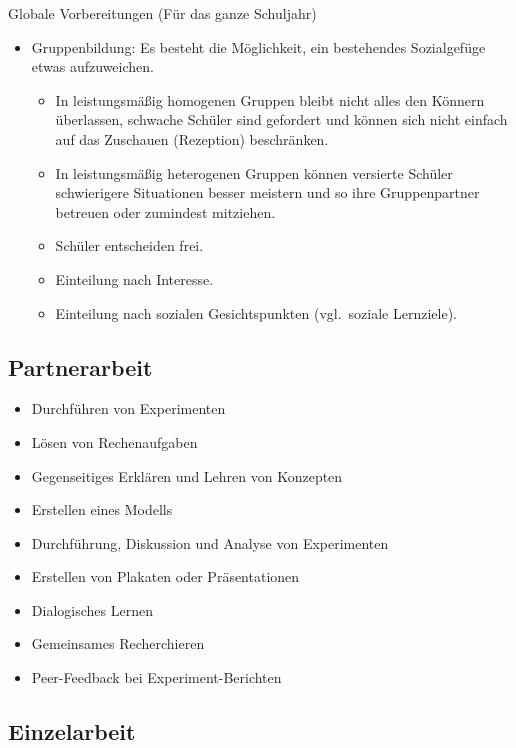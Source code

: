 Globale Vorbereitungen (F\"{u}r das ganze Schuljahr)
\begin{itemize}
\item
Gruppenbildung: Es besteht die M\"{o}glichkeit, ein bestehendes
Sozialgef\"{u}ge etwas aufzuweichen.
\begin{itemize}
\item
In leistungsm\"{a}{\ss}ig homogenen Gruppen
bleibt nicht alles den K\"{o}nnern \"{u}berlassen, schwache
Sch\"{u}ler sind gefordert und k\"{o}nnen sich nicht einfach auf
das Zuschauen (Rezeption) beschr\"{a}nken.
\item
In leistungsm\"{a}{\ss}ig heterogenen Gruppen k\"{o}nnen versierte
Sch\"{u}ler schwierigere Situationen besser meistern und so ihre
Gruppenpartner betreuen oder zumindest mitziehen.
\item
Sch\"{u}ler entscheiden frei.
\item
Einteilung nach Interesse.
\item
Einteilung nach sozialen Gesichtspunkten (vgl.\ soziale Lernziele).
\end{itemize}
\end{itemize}



\subsection{Partnerarbeit}

\begin{itemize}
\item Durchf\"{u}hren von Experimenten
\item L\"{o}sen von Rechenaufgaben
\item Gegenseitiges Erkl\"{a}ren und Lehren von Konzepten
\item Erstellen eines Modells
\item Durchf\"{u}hrung, Diskussion und Analyse von Experimenten
\item Erstellen von Plakaten oder Pr\"{a}sentationen
\item Dialogisches Lernen
\item Gemeinsames Recherchieren
\item Peer-Feedback bei Experiment-Berichten
\end{itemize}


\subsection{Einzelarbeit}

